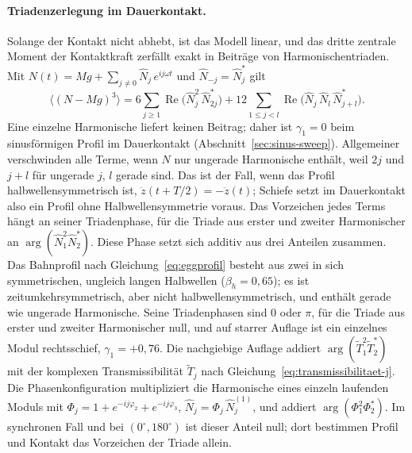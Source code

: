 \documentclass[12pt,a4paper]{report}
\begin{document}
\paragraph{Triadenzerlegung im Dauerkontakt.}
Solange der Kontakt nicht abhebt, ist das Modell linear, und das dritte
zentrale Moment der Kontaktkraft zerfällt exakt in Beiträge von
Harmonischentriaden. Mit
$N(t) = Mg + \sum_{j \neq 0} \hat{N}_j\, e^{ij\omega t}$ und
$\hat{N}_{-j} = \hat{N}_j^{*}$ gilt
\begin{equation}
  \bigl\langle (N - Mg)^{3} \bigr\rangle
  = 6 \sum_{j \geq 1} \operatorname{Re}\bigl(\hat{N}_j^{2}\,\hat{N}_{2j}^{*}\bigr)
  + 12 \sum_{1 \leq j < l} \operatorname{Re}\bigl(\hat{N}_j\,\hat{N}_l\,\hat{N}_{j+l}^{*}\bigr).
  \label{eq:triaden}
\end{equation}
Eine einzelne Harmonische liefert keinen Beitrag; daher ist
$\gamma_1 = 0$ beim sinusförmigen Profil im Dauerkontakt
(Abschnitt~\ref{sec:sinus-sweep}). Allgemeiner verschwinden alle Terme,
wenn $N$ nur ungerade Harmonische enthält, weil $2j$ und $j + l$ für
ungerade $j$, $l$ gerade sind. Das ist der Fall, wenn das Profil
halbwellensymmetrisch ist, $\ddot{z}(t + T/2) = -\ddot{z}(t)$; Schiefe
setzt im Dauerkontakt also ein Profil ohne Halbwellensymmetrie voraus.
Das Vorzeichen jedes Terms hängt an
seiner Triadenphase, für die Triade aus erster und zweiter Harmonischer
an $\arg(\hat{N}_1^{2}\hat{N}_2^{*})$. Diese Phase setzt sich additiv aus
drei Anteilen zusammen. Das Bahnprofil nach
Gleichung~\eqref{eq:eggprofil} besteht aus zwei in sich symmetrischen,
ungleich langen Halbwellen ($\beta_h = 0{,}65$); es ist
zeitumkehrsymmetrisch, aber nicht halbwellensymmetrisch, und enthält
gerade wie ungerade Harmonische. Seine Triadenphasen sind $0$
oder $\pi$, für die Triade aus erster und zweiter Harmonischer null, und
auf starrer Auflage ist ein einzelnes Modul rechtsschief,
$\gamma_1 = +0{,}76$. Die nachgiebige Auflage addiert
$\arg(\tilde{T}_1^{2}\tilde{T}_2^{*})$ mit der komplexen
Transmissibilität $\tilde{T}_j$ nach
Gleichung~\eqref{eq:transmissibilitaet-j}. Die Phasenkonfiguration
multipliziert die Harmonische eines einzeln laufenden Moduls mit
$\Phi_j = 1 + e^{-ij\varphi_2} + e^{-ij\varphi_3}$,
$\hat{N}_j = \Phi_j\, \hat{N}_j^{(1)}$, und addiert
$\arg(\Phi_1^{2}\Phi_2^{*})$. Im synchronen Fall und bei
$(0^\circ, 180^\circ)$ ist dieser Anteil null; dort bestimmen Profil und
Kontakt das Vorzeichen der Triade allein.
\end{document}

